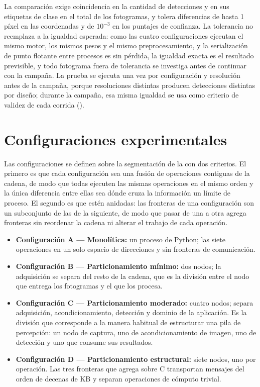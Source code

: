 La comparación exige coincidencia en la cantidad de detecciones y en sus
etiquetas de clase en el total de los fotogramas, y tolera diferencias de
hasta 1 píxel en las coordenadas y de $10^{-3}$ en los puntajes de
confianza. La tolerancia no reemplaza a la igualdad esperada: como las cuatro
configuraciones ejecutan el mismo motor, los mismos pesos y el mismo
preprocesamiento, y la serialización de punto flotante entre procesos es sin
pérdida, la igualdad exacta es el resultado previsible, y todo fotograma
fuera de tolerancia se investiga antes de continuar con la campaña. La prueba
se ejecuta una vez por configuración y resolución antes de la campaña, porque
resoluciones distintas producen detecciones distintas por diseño; durante la
campaña, esa misma igualdad se usa como criterio de validez de cada corrida
().

\section{Configuraciones experimentales}
\label{sec:configurations}

Las configuraciones se definen sobre la segmentación de la
 con dos criterios. El primero es que cada
configuración sea una fusión de operaciones contiguas de la cadena, de modo
que todas ejecuten las mismas operaciones en el mismo orden y la única
diferencia entre ellas sea dónde cruza la información un límite de proceso.
El segundo es que estén anidadas: las fronteras de una configuración son un
subconjunto de las de la siguiente, de modo que pasar de una a otra agrega
fronteras sin reordenar la cadena ni alterar el trabajo de cada operación.

\begin{itemize}
  \item \textbf{Configuración A --- Monolítica:} un proceso de Python; las
        siete operaciones en un solo espacio de direcciones y sin fronteras
        de comunicación.
  \item \textbf{Configuración B --- Particionamiento mínimo:} dos nodos; la
        adquisición se separa del resto de la cadena, que es la división
        entre el nodo que entrega los fotogramas y el que los procesa.
  \item \textbf{Configuración C --- Particionamiento moderado:} cuatro
        nodos; separa adquisición, acondicionamiento, detección y dominio de
        la aplicación. Es la división que corresponde a la manera habitual
        de estructurar una pila de percepción: un nodo de captura, uno de
        acondicionamiento de imagen, uno de detección y uno que consume sus
        resultados.
  \item \textbf{Configuración D --- Particionamiento estructural:} siete
        nodos, uno por operación. Las tres fronteras que agrega sobre C
        transportan mensajes del orden de decenas de KB y separan
        operaciones de cómputo trivial.
\end{itemize}

